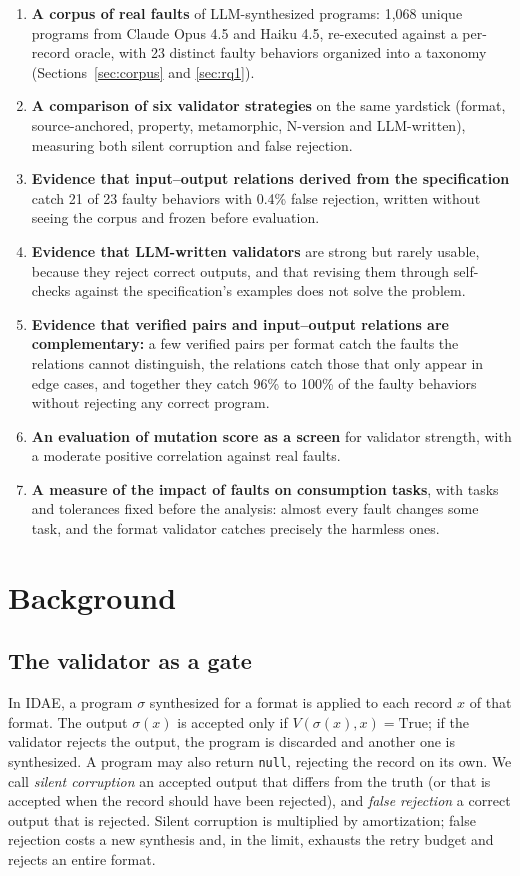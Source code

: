 \documentclass[sigconf,nonacm]{acmart}
\begin{document}
\begin{enumerate}
\item \textbf{A corpus of real faults} of LLM-synthesized programs: 1{,}068 unique programs from Claude Opus 4.5 and Haiku 4.5, re-executed against a per-record oracle, with 23 distinct faulty behaviors organized into a taxonomy (Sections~\ref{sec:corpus} and \ref{sec:rq1}).
\item \textbf{A comparison of six validator strategies} on the same yardstick (format, source-anchored, property, metamorphic, N-version \cite{avizienis1985nversion} and LLM-written), measuring both silent corruption and false rejection.
\item \textbf{Evidence that input--output relations derived from the specification} catch 21 of 23 faulty behaviors with 0.4\% false rejection, written without seeing the corpus and frozen before evaluation.
\item \textbf{Evidence that LLM-written validators} are strong but rarely usable, because they reject correct outputs, and that revising them through self-checks against the specification's examples does not solve the problem.
\item \textbf{Evidence that verified pairs and input--output relations are complementary:} a few verified pairs per format catch the faults the relations cannot distinguish, the relations catch those that only appear in edge cases, and together they catch 96\% to 100\% of the faulty behaviors without rejecting any correct program.
\item \textbf{An evaluation of mutation score as a screen} for validator strength, with a moderate positive correlation against real faults.
\item \textbf{A measure of the impact of faults on consumption tasks}, with tasks and tolerances fixed before the analysis: almost every fault changes some task, and the format validator catches precisely the harmless ones.
\end{enumerate}

\section{Background}
\label{sec:contexto}

\subsection{The validator as a gate}

In IDAE, a program $\sigma$ synthesized for a format is applied to each record $x$ of that format. The output $\sigma(x)$ is accepted only if $V(\sigma(x), x) = \text{True}$; if the validator rejects the output, the program is discarded and another one is synthesized. A program may also return \texttt{null}, rejecting the record on its own. We call \textit{silent corruption} an accepted output that differs from the truth (or that is accepted when the record should have been rejected), and \textit{false rejection} a correct output that is rejected. Silent corruption is multiplied by amortization; false rejection costs a new synthesis and, in the limit, exhausts the retry budget and rejects an entire format.
\end{document}
